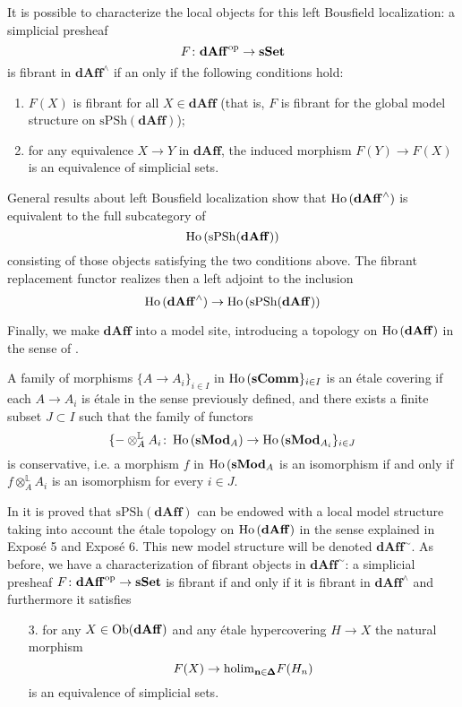 \begin{refsection}
It is possible to characterize the local objects for this left Bousfield localization: a simplicial presheaf
\[
F \colon \mathbf{dAff}^{\mathrm{op}} \to \mathbf{sSet}
\]
is fibrant in $\mathbf{dAff}^\wedge$ if an only if the following conditions hold:
\begin{enumerate}
\item $F(X)$ is fibrant for all $X \in \mathbf{dAff}$ (that is, $F$ is fibrant for the global model structure on $\mathrm{sPSh}(\mathbf{dAff})$);
\item for any equivalence $X \to Y$ in $\mathbf{dAff}$, the induced morphism $F(Y) \to F(X)$ is an equivalence of simplicial sets.
\end{enumerate}

General results about left Bousfield localization show that $\operatorname{\mathrm{Ho} \,}(\mathbf{dAff}^\wedge)$ is equivalent to the full subcategory of
\[
\operatorname{\mathrm{Ho} \,}(\mathrm{sPSh}(\mathbf{dAff}))
\]
consisting of those objects satisfying the two conditions above. The fibrant replacement functor realizes then a left adjoint to the inclusion
\[
\operatorname{\mathrm{Ho} \,}(\mathbf{dAff}^\wedge) \to \operatorname{\mathrm{Ho} \,}(\mathrm{sPSh}(\mathbf{dAff}))
\]

Finally, we make $\mathbf{dAff}$ into a model site, introducing a topology on $\operatorname{\mathrm{Ho} \,}(\mathbf{dAff})$ in the sense of \cite{hagI}.

\begin{defin}
A family of morphisms $\{A \to A_i\}_{i \in I}$ in $\operatorname{\mathrm{Ho} \,}(\mathbf{sComm}\}_{i \in I}$ is an \'etale covering if each $A \to A_i$ is \'etale in the sense previously defined, and there exists a finite subset $J \subset I$ such that the family of functors
\[
\{- \otimes_A^{\mathbb L} A_i \colon \operatorname{\mathrm{Ho} \,}(\mathbf s \mathbf{Mod}_A) \to \operatorname{\mathrm{Ho} \,}(\mathbf s \mathbf{Mod}_{A_i} \}_{i \in J}
\]
is conservative, i.e. a morphism $f$ in $\operatorname{\mathrm{Ho} \,}(\mathbf s \mathbf{Mod}_A$ is an isomorphism if and only if $f \otimes_A^{\mathbb L} A_i$ is an isomorphism for every $i \in J$.
\end{defin}

In \cite{hagI} it is proved that $\mathrm{sPSh}(\mathbf{dAff})$ can be endowed with a local model structure taking into account the \'etale topology on $\operatorname{\mathrm{Ho} \,}(\mathbf{dAff})$ in the sense explained in Expos\'e 5 and Expos\'e 6. This new model structure will be denoted $\mathbf{dAff}^{\sim}$. As before, we have a characterization of fibrant objects in $\mathbf{dAff}^{\sim}$: a simplicial presheaf $F \colon \mathbf{dAff}^{\mathrm{op}} \to \mathbf{sSet}$ is fibrant if and only if it is fibrant in $\mathbf{dAff}^\wedge$ and furthermore it satisfies
\begin{enumerate}
\item[3.] for any $X \in \operatorname{Ob}(\mathbf{dAff})$ and any \'etale hypercovering $H \to X$ the natural morphism
\[
F(X) \to \mathrm{holim}_{\mathbf n \in \pmb{\Delta}} F(H_n)
\]
is an equivalence of simplicial sets.
\end{enumerate}


\end{refsection}
